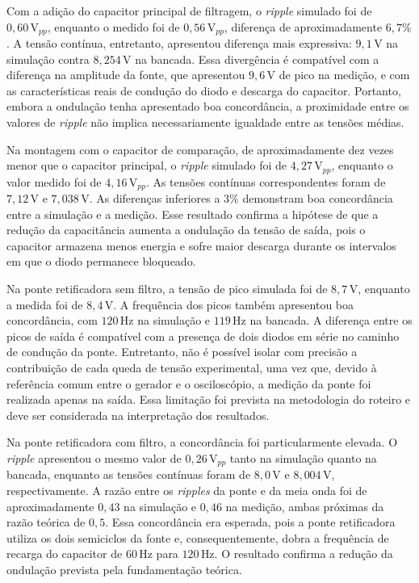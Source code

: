 \documentclass[11pt,a4paper]{article}
\begin{document}
Com a adição do capacitor principal de filtragem, o \textit{ripple} simulado foi de $0{,}60\,\text{V}_{pp}$, enquanto o medido foi de $0{,}56\,\text{V}_{pp}$, diferença de aproximadamente $6{,}7\%$. A tensão contínua, entretanto, apresentou diferença mais expressiva: $9{,}1\,\text{V}$ na simulação contra $8{,}254\,\text{V}$ na bancada. Essa divergência é compatível com a diferença na amplitude da fonte, que apresentou $9{,}6\,\text{V}$ de pico na medição, e com as características reais de condução do diodo e descarga do capacitor. Portanto, embora a ondulação tenha apresentado boa concordância, a proximidade entre os valores de \textit{ripple} não implica necessariamente igualdade entre as tensões médias.

Na montagem com o capacitor de comparação, de aproximadamente dez vezes menor que o capacitor principal, o \textit{ripple} simulado foi de $4{,}27\,\text{V}_{pp}$, enquanto o valor medido foi de $4{,}16\,\text{V}_{pp}$. As tensões contínuas correspondentes foram de $7{,}12\,\text{V}$ e $7{,}038\,\text{V}$. As diferenças inferiores a $3\%$ demonstram boa concordância entre a simulação e a medição. Esse resultado confirma a hipótese de que a redução da capacitância aumenta a ondulação da tensão de saída, pois o capacitor armazena menos energia e sofre maior descarga durante os intervalos em que o diodo permanece bloqueado.

Na ponte retificadora sem filtro, a tensão de pico simulada foi de $8{,}7\,\text{V}$, enquanto a medida foi de $8{,}4\,\text{V}$. A frequência dos picos também apresentou boa concordância, com $120\,\text{Hz}$ na simulação e $119\,\text{Hz}$ na bancada. A diferença entre os picos de saída é compatível com a presença de dois diodos em série no caminho de condução da ponte. Entretanto, não é possível isolar com precisão a contribuição de cada queda de tensão experimental, uma vez que, devido à referência comum entre o gerador e o osciloscópio, a medição da ponte foi realizada apenas na saída. Essa limitação foi prevista na metodologia do roteiro e deve ser considerada na interpretação dos resultados.

Na ponte retificadora com filtro, a concordância foi particularmente elevada. O \textit{ripple} apresentou o mesmo valor de $0{,}26\,\text{V}_{pp}$ tanto na simulação quanto na bancada, enquanto as tensões contínuas foram de $8{,}0\,\text{V}$ e $8{,}004\,\text{V}$, respectivamente. A razão entre os \textit{ripples} da ponte e da meia onda foi de aproximadamente $0{,}43$ na simulação e $0{,}46$ na medição, ambas próximas da razão teórica de $0{,}5$. Essa concordância era esperada, pois a ponte retificadora utiliza os dois semiciclos da fonte e, consequentemente, dobra a frequência de recarga do capacitor de $60\,\text{Hz}$ para $120\,\text{Hz}$. O resultado confirma a redução da ondulação prevista pela fundamentação teórica.
\end{document}
